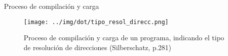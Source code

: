 \documentclass[presentation]{beamer}
\begin{document}
\begin{frame}[label={sec:org30c1ca9}]{Proceso de compilación y carga}
\begin{figure}[htbp]
\centering
\texttt{[image: ../img/dot/tipo\_resol\_direcc.png]}
\caption{Proceso de compilación y carga de un programa, indicando el tipo de resolución de direcciones  (Silberschatz, p.281)}
\end{figure}
\end{frame}
\end{document}
